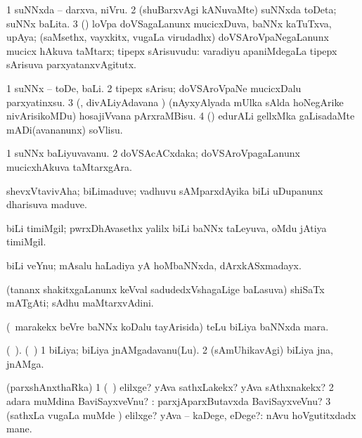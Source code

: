 {{{{{{\bentry
{} 
\gl{\nA}
\expl{}
\bmng
\bnum
\num{1} suNNxda -- darxva, niVru. 
\num{2} (shuBarxvAgi kANuvaMte) suNNxda toDeta; suNNx baLita. 
\num{3} (\rUpa) loVpa doVSagaLanunx mucicxDuva, baNNx kaTuTxva, upAya; (saMsethx, vayxkitx, \mo vugaLa virudadhx) doVSAroVpaNegaLanunx mucicx hAkuva taMtarx; tipepx sArisuvudu:  varadiyu apaniMdegaLa tipepx sArisuva parxyatanxvAgitutx. 
\enum
\emng
\eentry

\bentry
{} 
\gl{\sakirx}
\bmng
\bnum
\num{1} suNNx -- toDe, baLi. 
\num{2} tipepx sArisu; doVSAroVpaNe mucicxDalu parxyatinxsu. 
\num{3} (\kaparx, divALiyAdavana \vi) (nAyxyAlyada mUlka sAlda hoNegArike nivArisikoMDu) hosajiVvana pArxraMBisu. 
\num{4} (\ame) edurALi gellxMka gaLisadaMte mADi(avananunx) soVlisu. 
\enum
\emng
\eentry

\bentry
{}
 \gl{\nA}\bmng
\bnum
\num{1} suNNx baLiyuvavanu. 
\num{2} doVSAcACxdaka; doVSAroVpagaLanunx mucicxhAkuva taMtarxgAra. 
\enum
\emng
\eentry

\bentry
{}
 \gl{\nA}\bmng
shevxVtavivAha; biLimaduve; vadhuvu sAMparxdAyika biLi uDupanunx dharisuva maduve. 
\emng
\eentry

\bentry
{} 
\gl{\nA}
\expl{}
\bmng
biLi timiMgil; pwrxDhAvasethx yalilx biLi baNNx taLeyuva, oMdu jAtiya timiMgil. 
\emng
\eentry

\bentry
{}
 \gl{\nA}\bmng
biLi veYnu; mAsalu haLadiya yA hoMbaNNxda, dArxkASxmadayx. 
\emng
\eentry

\bentry
{}
 \gl{\nA}\bmng
(tananx shakitxgaLanunx keVval sadudedxVshagaLige baLasuva) shiSaTx mATgAti; sAdhu maMtarxvAdini. 
\emng
\eentry

\bentry
{}
  \gl{\nA}\bmng
(\kanmu\ marakekx beVre baNNx koDalu tayArisida) teLu biLiya baNNxda mara. 
\emng
\eentry

\bentry
{}
  \gl{\nA}(\bava\ ). \bmng
 (\sA\ \hiV) 
\bnum
\num{1} biLiya; biLiya jnAMgadavanu(Lu). 
\num{2} (sAmUhikavAgi) biLiya jna, jnAMga. 
\enum
\emng
\eentry

\bentry
{} 
\gl{\kirxvi}
\bmng
(parxshAnxthaRka) 
\bnum
\num{1} (\pArxparx\ \rUpa) elilxge? yAva sathxLakekx? yAva sAthxnakekx? 
\num{2} adara muMdina BaviSayxveVnu? :  parxjAparxButavxda BaviSayxveVnu? 
\num{3} (sathxLa \mo vugaLa muMde \parx) elilxge? yAva -- kaDege, eDege?:  nAvu hoVgutitxdadx mane. 
\enum
\emng
\eentry

}}}}}}
